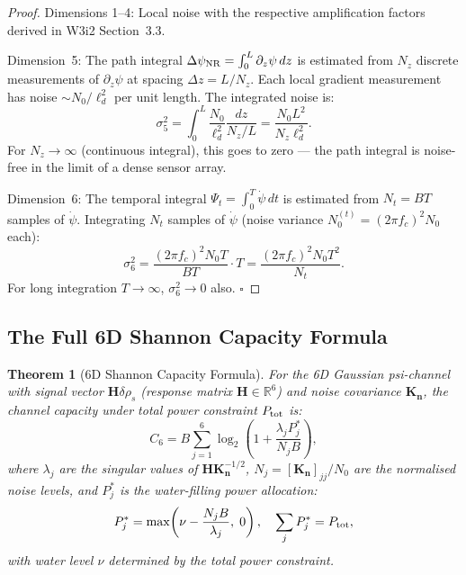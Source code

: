 \documentclass[aps,prd,twocolumn,superscriptaddress,nofootinbib]{revtex4-2}
\newtheorem{theorem}{Theorem}
\begin{document}
\begin{proof}
Dimensions 1--4: Local noise with the respective amplification factors
derived in W3i2 Section~3.3.

Dimension~5: The path integral $\Delta\psi_{\rm NR} = \int_0^L \partial_z\psi\,dz$
is estimated from $N_z$ discrete measurements of $\partial_z\psi$ at spacing
$\Delta z = L/N_z$. Each local gradient measurement has noise $\sim N_0/\ell_d^2$
per unit length. The integrated noise is:
\begin{equation}
\sigma_5^2 = \int_0^L \frac{N_0}{\ell_d^2} \frac{dz}{N_z / L}
= \frac{N_0 L^2}{N_z \ell_d^2}.
\end{equation}
For $N_z \to \infty$ (continuous integral), this goes to zero --- the path
integral is noise-free in the limit of a dense sensor array.

Dimension~6: The temporal integral $\Psi_t = \int_0^T \dot\psi\,dt$ is estimated
from $N_t = BT$ samples of $\dot\psi$. Integrating $N_t$ samples of
$\dot\psi$ (noise variance $N_0^{(t)} = (2\pi f_c)^2 N_0$ each):
\begin{equation}
\sigma_6^2 = \frac{(2\pi f_c)^2 N_0 T}{B T} \cdot T = \frac{(2\pi f_c)^2 N_0 T^2}{N_t}.
\end{equation}
For long integration $T \to \infty$, $\sigma_6^2 \to 0$ also. $\square$
\end{proof}

\subsection{The Full 6D Shannon Capacity Formula}

\begin{theorem}[6D Shannon Capacity Formula]
\label{thm:6D-shannon}
For the 6D Gaussian psi-channel with signal vector $\mathbf{H}\delta\rho_s$
(response matrix $\mathbf{H} \in \mathbb{R}^6$) and noise covariance
$\mathbf{K}_{\mathbf{n}}$, the channel capacity under total power constraint
$P_{\rm tot}$ is:
\begin{equation}
\boxed{
C_6 = B \sum_{j=1}^{6} \log_2\!\left(1 + \frac{\lambda_j P_j^*}{N_j B}\right),
}
\label{eq:C6-full}
\end{equation}
where $\lambda_j$ are the singular values of $\mathbf{H} \mathbf{K}_{\mathbf{n}}^{-1/2}$,
$N_j = [\mathbf{K}_{\mathbf{n}}]_{jj}/N_0$ are the normalised noise levels,
and $P_j^*$ is the water-filling power allocation:
\begin{equation}
P_j^* = \max\!\left(\nu - \frac{N_j B}{\lambda_j},\; 0\right),
\quad \sum_j P_j^* = P_{\rm tot},
\label{eq:water-fill}
\end{equation}
with water level $\nu$ determined by the total power constraint.
\end{theorem}
\end{document}
